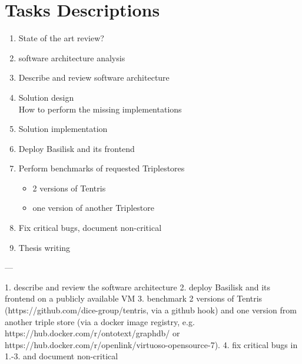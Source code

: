 \chapter{Tasks Descriptions}
\label{ch:tasks}

\begin{enumerate}
	\item State of the art review?
	\item software architecture analysis
	\item Describe and review software architecture
	\item Solution design \\
		How to perform the missing implementations
	\item Solution implementation
	\item Deploy Basilisk and its frontend
	\item Perform benchmarks of requested Triplestores
		\begin{itemize}
			\item 2 versions of Tentris
			\item one version of another Triplestore
		\end{itemize}
	\item Fix critical bugs, document non-critical
	\item Thesis writing
\end{enumerate}



---

1. describe and review the software architecture
2. deploy Basilisk and its frontend on a publicly available VM
3. benchmark 2 versions of Tentris
(https://github.com/dice-group/tentris, via a github hook) and
one version from another triple store (via a docker image
registry, e.g. https://hub.docker.com/r/ontotext/graphdb/ or
https://hub.docker.com/r/openlink/virtuoso-opensource-7).
4. fix critical bugs in 1.-3. and document non-critical